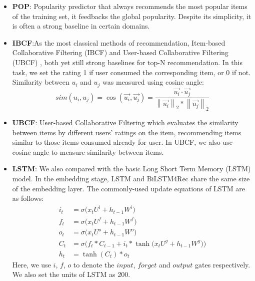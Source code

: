 \documentclass[runningheads]{llncs}
\begin{document}
 \begin{itemize}
\item \textbf{POP}: Popularity predictor that always recommends the most popular items of the training set, it feedbacks the global popularity. Despite its simplicity, it is often a strong baseline in certain domains.
\item \textbf{IBCF}:As the most classical methods of recommendation, Item-based Collaborative Filtering (IBCF) \cite{sarwar2001item}and User-based Collaborative Filtering (UBCF) \cite{Resnick:1994:GOA:192844.192905}, both yet still strong baselines for top-N recommendation. In this task, we set the rating 1 if user consumed the corresponding item, or 0 if not. Similarity between $u_{i}$ and $u_{j}$ was measured using cosine angle:
\begin{equation}
sim(u_{i},u_{j})=\cos (\vec{u_{i}},\vec{u_{j}})=\frac{\vec{u_{i}}\cdot \vec{u_{j}}}{\left \| \vec{u_{i}} \right \|_{2}\ast \left \| \vec{u_{j}} \right \|_{2}}
\end{equation}

\item \textbf{UBCF}: User-based Collaborative Filtering which evaluates the similarity between items by different users' ratings on the item, recommending items similar to those items consumed already for user. In UBCF, we also use cosine angle to measure similarity between items.

\item \textbf{LSTM}: We also compared with the basic Long Short Term Memory (LSTM) \cite{Hochreiter:1997:LSTM} model. In the embedding stage, LSTM and BiLSTM4Rec share the same size of the embedding layer. The commonly-used update equations of LSTM are as follows:
\begin{equation}
\begin{aligned}
    i_{t} & =\sigma\big(x_{t}U^{i}+h_{t-1}W^{i}\big)\\
    f_{t} & =\sigma\big(x_{t}U^{f}+h_{t-1}W^{f}\big)\\
    o_{t} & =\sigma\big(x_{t}U^{o}+h_{t-1}W^{o}\big)\\
    C_{t} & =\sigma\big(f_{t}\ast C_{t-1}+i_{t}\ast\tanh\big(x_{t}U^{g}+h_{t-1}W^{g}\big)\big)\\
    h_{t} & =\tanh(C_{t})\ast o_{t}
\end{aligned}
\end{equation}
Here, we use $i$, $f$, $o$ to denote the $input$, $forget$ and $output$ gates respectively. We also set the units of LSTM as 200.
\end{itemize}
\end{document}
